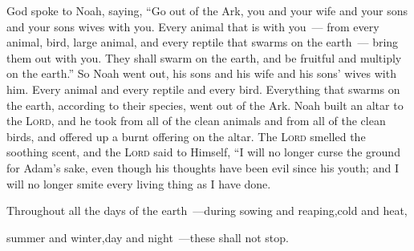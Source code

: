 \begin{inparaenum}
   God spoke to Noah, saying,%
   ``Go out of the Ark, you and your wife and your sons and your sons wives with you.%
   Every animal that is with you~--- from every animal, bird, large animal, and every reptile that swarms on the earth~--- bring them out with you. They shall swarm on the earth, and be fruitful and multiply on the earth.''%
   So Noah went out, his sons and his wife and his sons' wives with him.%
   Every animal and every reptile and every bird. Everything that swarms on the earth, according to their species, went out of the Ark.%
   Noah built an altar to the \textsc{Lord}, and he took from all of the clean animals and from all of the clean birds, and offered up a burnt offering on the altar.%
   The \textsc{Lord} smelled the soothing scent, and the \textsc{Lord} said to Himself, ``I will no longer curse the ground for Adam's sake, even though his thoughts have been evil since his youth; and I will no longer smite every living thing as I have done.%
  
  \pc {} Throughout all the days of the earth~---\pa during sowing and reaping,\pa cold and heat,%
  
  \pc summer and winter,\pa day and night~---\pa these shall not stop.%
\end{inparaenum}
